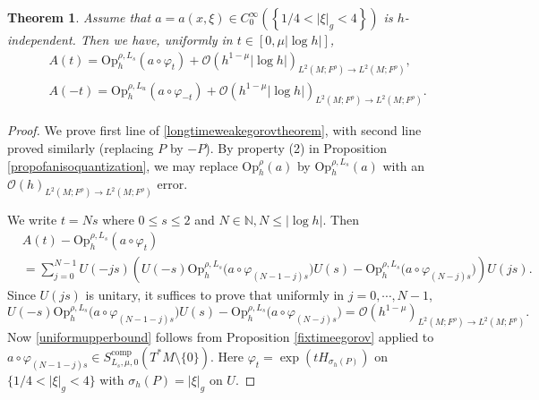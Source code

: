 \documentclass[11pt,oneside,reqno]{amsart}
\newtheorem{theorem}{Theorem}[section]
\theoremstyle{definition}
\numberwithin{equation}{section}
\theoremstyle{plain}
\begin{document}
\begin{theorem}\label{longtimeegorovtheorem}
Assume that $a=a(x,\xi) \in C_0^{\infty}\left(\left\{1 / 4<|\xi|_g<4\right\}\right)$ is $h$-independent. Then we have, uniformly in $t \in[0, \mu |\log h|]$,
\begin{equation}\label{longtimeweakegorovtheorem}
\begin{aligned}
& A(t)=\mathrm{Op}_h^{\rho,L_s} (a \circ \varphi_t )+\mathcal{O} (h^{1-\mu} |\log h| )_{L^2(M;F^\rho) \rightarrow L^2(M;F^\rho)} ,\\
& A(-t)=\mathrm{Op}_h^{\rho,L_u} (a \circ \varphi_{-t} )+\mathcal{O} (h^{1-\mu} |\log h| )_{L^2(M;F^\rho) \rightarrow L^2(M;F^\rho)}  .
\end{aligned}
\end{equation}
\end{theorem}

\begin{proof}
We prove first line of \eqref{longtimeweakegorovtheorem}, with second line proved similarly (replacing $P$ by $-P$). By property (2) in Proposition \ref{propofanisoquantization}, we may replace $\mathrm{Op}_h^{\rho}(a)$ by $\mathrm{Op}_h^{\rho,L_{s}}(a)$ with an $\mathcal{O}(h)_{L^2(M;F^\rho) \rightarrow L^2(M;F^\rho)}$ error.

We write $t=N s$ where $0 \leq s \leq 2$ and $N \in \mathbb{N}, N \leq |\log h|$. Then
\begin{equation}
\begin{aligned}
&A(t)-\mathrm{Op}_h^{\rho,L_s}\left(a \circ \varphi_t\right) \\
&=\sum_{j=0}^{N-1} U(-j s)\left( U(-s) \mathrm{Op}_h^{\rho,L_s} \big(a \circ \varphi_{(N-1-j) s} \big) U(s)-\mathrm{Op}_h^{\rho,L_s}  \big(a \circ \varphi_{(N-j) s}\big)  \right) U(j s) .
\end{aligned}
\end{equation}
Since $U(j s)$ is unitary, it suffices to prove that uniformly in $j=0, \cdots, N-1$,
\begin{equation}\label{uniformupperbound}
U(-s) \mathrm{Op}_h^{\rho,L_s} \big(a \circ \varphi_{(N-1-j) s} \big) U(s)-\mathrm{Op}_h^{\rho,L_s}  \big(a \circ \varphi_{(N-j) s}\big)=\mathcal{O}(h^{1-\mu})_{L^2(M;F^\rho) \rightarrow L^2(M;F^\rho)}.
\end{equation}
Now \eqref{uniformupperbound} follows from Proposition \ref{fixtimeegorov} applied to $a \circ \varphi_{(N-1-j) s} \in S_{L_{s}, \mu,0}^{\mathrm{comp}}(T^* M \setminus \{0\})$. Here $\varphi_t=\exp \left(t H_{\sigma_h(P)}\right)$ on $\{1 / 4<|\xi|_g<4\}$ with $\sigma_h(P)=|\xi|_g$ on $U$.
\end{proof}
\end{document}
